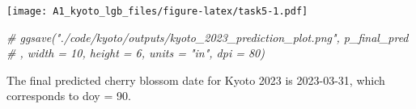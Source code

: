 \documentclass[
]{article}
\newenvironment{Shaded}{\begin{snugshade}}{\end{snugshade}}
\newcommand{\CommentTok}[1]{\textcolor[rgb]{0.56,0.35,0.01}{\textit{#1}}}
\begin{document}
\texttt{[image: A1\_kyoto\_lgb\_files/figure-latex/task5-1.pdf]}

\begin{Shaded}
\begin{Highlighting}[]
\CommentTok{\# ggsave("./code/kyoto/outputs/kyoto\_2023\_prediction\_plot.png", p\_final\_pred}
\CommentTok{\#     , width = 10, height = 6, units = "in", dpi = 80)}
\end{Highlighting}
\end{Shaded}

The final predicted cherry blossom date for Kyoto 2023 is 2023-03-31,
which corresponds to doy = 90.
\end{document}
